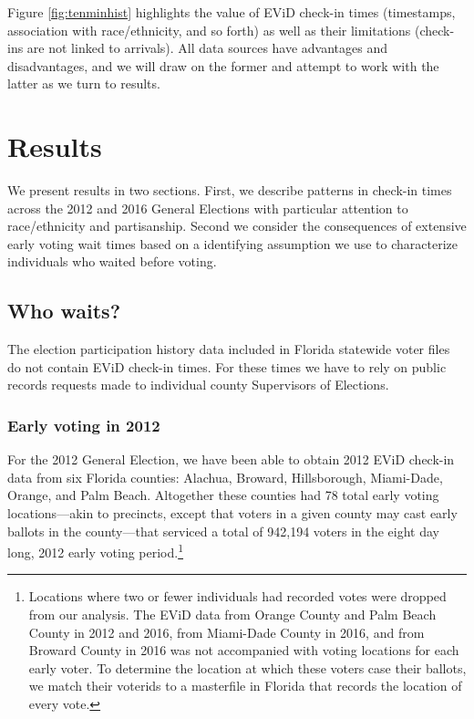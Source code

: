 \documentclass[12pt,titlepage]{article}
\begin{document}
Figure \ref{fig:tenminhist} highlights the value of EViD check-in
times (timestamps, association with race/ethnicity, and so forth) as well as
their limitations (check-ins are not linked to arrivals).  All data
sources have advantages and disadvantages, and we will draw on the
former and attempt to work with the latter as we turn to results.

\section*{Results}

We present results in two sections.  First, we describe patterns in
check-in times across the 2012 and 2016 General Elections with
particular attention to race/ethnicity and partisanship.  Second we consider the
consequences of extensive early voting wait times based on a
identifying assumption we use to characterize individuals who waited
before voting.

\subsection*{Who waits?}

The election participation history data included in Florida statewide
voter files do not contain EViD check-in times.  For these times we
have to rely on public records requests made to individual county
Supervisors of Elections.

\subsubsection*{Early voting in 2012}

For the 2012 General Election, we have been able to obtain 2012 EViD
check-in data from six Florida counties: Alachua, Broward,
Hillsborough, Miami-Dade, Orange, and Palm Beach.  Altogether these
counties had 78 total early voting locations---akin to precincts,
except that voters in a given county may cast early ballots in the
county---that serviced a total of 942,194 voters in the eight day
long, 2012 early voting period.\footnote{Locations where two or fewer
  individuals had recorded votes were dropped from our analysis.  The
  EViD data from Orange County and Palm Beach County in 2012 and 2016,
  from Miami-Dade County in 2016, and from Broward County in 2016 was
  not accompanied with voting locations for each early voter.  To
  determine the location at which these voters case their ballots, we
  match their voterids to a masterfile in Florida that records the
  location of every vote.}
\end{document}
